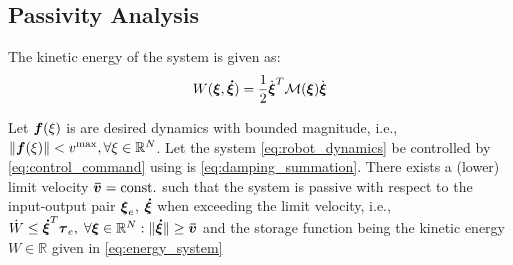 \subsection{Passivity Analysis}

The kinetic energy of the system is given as:
\begin{equation}
	W(\vecs \xi, \vecs{\dot \xi}) = \frac{1}{2}  \dot{\vecs{\xi}}^T \matd{M}(\vecs \xi) \dot{\vecs{\xi}} \label{eq:energy_system}
\end{equation}

\begin{theorem}  \label{theorem:passivity}
	Let $\boldsymbol{f}(\xi)$ is are desired dynamics with bounded magnitude, i.e., $\| \boldsymbol{f}(\xi) \| < v^{\mathrm{max}}, \forall \xi \in \mathbb{R}^N$.
  Let the system \eqref{eq:robot_dynamics} be controlled by \eqref{eq:control_command} using is \eqref{eq:damping_summation}.
   There exists a (lower) limit velocity $\boldsymbol{\bar v} = \text{const.}$ such that the system is passive with respect to the input-output pair $\boldsymbol{\xi}_e$, $\boldsymbol{\dot \xi}$ when exceeding the limit velocity, i.e., $\dot{W} \leq \boldsymbol{\dot \xi}^T \boldsymbol{\tau}_e, \; \forall \boldsymbol{\xi} \in \mathbb{R}^N: \| \boldsymbol{\dot \xi} \| \geq \boldsymbol{\bar v}$ and the storage function being the kinetic energy $W \in \mathbb{R}$ given in \eqref{eq:energy_system}
\end{theorem}
 
